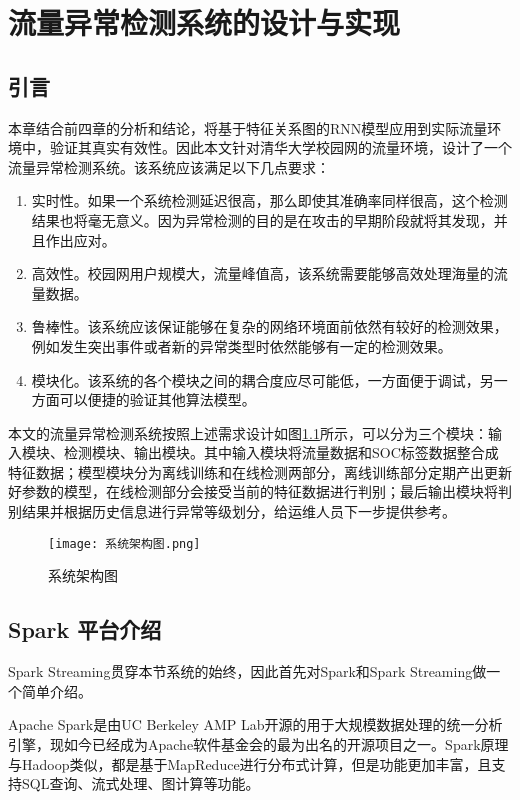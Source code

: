 \chapter{流量异常检测系统的设计与实现}
\section{引言}
本章结合前四章的分析和结论，将基于特征关系图的RNN模型应用到实际流量环境中，验证其真实有效性。因此本文针对清华大学校园网的流量环境，设计了一个流量异常检测系统。该系统应该满足以下几点要求：
\begin{enumerate}
  \item 实时性。如果一个系统检测延迟很高，那么即使其准确率同样很高，这个检测结果也将毫无意义。因为异常检测的目的是在攻击的早期阶段就将其发现，并且作出应对。
  \item 高效性。校园网用户规模大，流量峰值高，该系统需要能够高效处理海量的流量数据。
  \item 鲁棒性。该系统应该保证能够在复杂的网络环境面前依然有较好的检测效果，例如发生突出事件或者新的异常类型时依然能够有一定的检测效果。
  \item 模块化。该系统的各个模块之间的耦合度应尽可能低，一方面便于调试，另一方面可以便捷的验证其他算法模型。
\end{enumerate}

本文的流量异常检测系统按照上述需求设计如图\ref{fig:arch}所示，可以分为三个模块：输入模块、检测模块、输出模块。其中输入模块将流量数据和SOC标签数据整合成特征数据；模型模块分为离线训练和在线检测两部分，离线训练部分定期产出更新好参数的模型，在线检测部分会接受当前的特征数据进行判别；最后输出模块将判别结果并根据历史信息进行异常等级划分，给运维人员下一步提供参考。
\begin{figure}
    \centering
    \texttt{[image: 系统架构图.png]}
    \caption{系统架构图}
    \label{fig:arch}
  \end{figure}


\section{Spark 平台介绍}
Spark Streaming贯穿本节系统的始终，因此首先对Spark和Spark Streaming做一个简单介绍。

Apache Spark是由UC Berkeley AMP Lab开源的用于大规模数据处理的统一分析引擎\cite{spark}，现如今已经成为Apache软件基金会的最为出名的开源项目之一。Spark原理与Hadoop类似，都是基于MapReduce进行分布式计算，但是功能更加丰富，且支持SQL查询、流式处理、图计算等功能。

